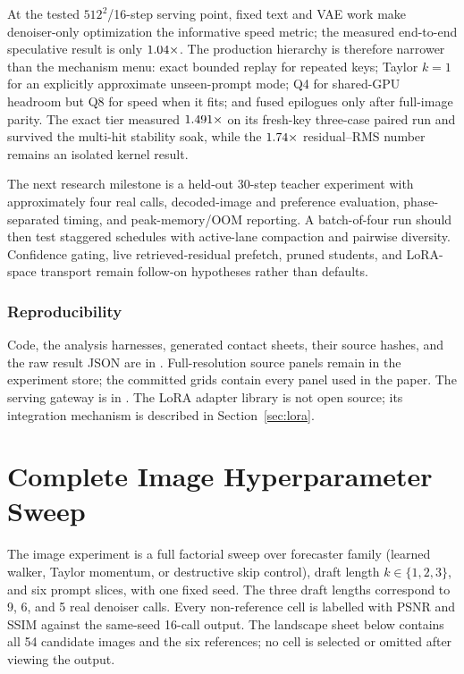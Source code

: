 \documentclass[11pt,a4paper]{article}
\begin{document}
At the tested $512^2$/16-step serving point, fixed text and VAE work make
denoiser-only optimization the informative speed metric; the measured
end-to-end speculative result is only $1.04\times$. The production
hierarchy is therefore narrower than the mechanism menu: exact bounded replay
for repeated keys; Taylor $k=1$ for an explicitly approximate unseen-prompt
mode; Q4 for shared-GPU headroom but Q8 for speed when it fits; and fused
epilogues only after full-image parity. The exact tier measured
$1.491\times$ on its fresh-key three-case paired run and survived the
multi-hit stability soak, while the $1.74\times$ residual--RMS
number remains an isolated kernel result.

The next research milestone is a held-out 30-step teacher experiment with
approximately four real calls, decoded-image and preference evaluation,
phase-separated timing, and peak-memory/OOM reporting. A batch-of-four run
should then test staggered schedules with active-lane compaction and pairwise
diversity. Confidence gating, live retrieved-residual prefetch, pruned students,
and LoRA-space transport remain follow-on hypotheses rather than defaults.

\subsubsection*{Reproducibility}

Code, the analysis harnesses, generated contact sheets, their source hashes,
and the raw result JSON are in \citet{cutedsl}. Full-resolution source panels
remain in the experiment store; the committed grids contain every panel used in
the paper. The serving gateway is in
\citet{omniservenative}. The LoRA adapter library is not open source; its
integration mechanism is described in Section~\ref{sec:lora}.

\clearpage
\appendix

\section{Complete Image Hyperparameter Sweep}
\label{app:image-sweep}

The image experiment is a full factorial sweep over forecaster family (learned
walker, Taylor momentum, or destructive skip control), draft length
$k\in\{1,2,3\}$, and six prompt slices, with one fixed seed. The three
draft lengths correspond to 9, 6, and 5 real denoiser calls. Every non-reference
cell is labelled with PSNR and SSIM against the same-seed 16-call output. The
landscape sheet below contains all 54 candidate images and the six references;
no cell is selected or omitted after viewing the output.
\end{document}
